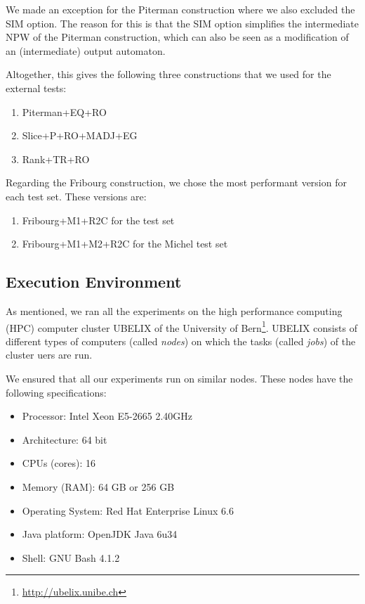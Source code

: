 We made an exception for the Piterman construction where we also excluded the SIM option. The reason for this is that the SIM option simplifies the intermediate NPW of the Piterman construction, which can also be seen as a modification of an (intermediate) output automaton.

Altogether, this gives the following three constructions that we used for the external tests:
\begin{enumerate}
\item Piterman+EQ+RO
\item Slice+P+RO+MADJ+EG
\item Rank+TR+RO
\end{enumerate}

Regarding the Fribourg construction, we chose the most performant version for each test set. These versions are:
\begin{enumerate}
\item Fribourg+M1+R2C for the \goal{} test set
\item Fribourg+M1+M2+R2C for the Michel test set
\end{enumerate}


\subsection{Execution Environment}
\label{4_exec_env}
As mentioned, we ran all the experiments on the high performance computing (HPC) computer cluster UBELIX of the University of Bern\footnote{\url{http://ubelix.unibe.ch}}. UBELIX consists of different types of computers (called \textit{nodes}) on which the tasks (called \textit{jobs}) of the cluster uers are run.

We ensured that all our experiments run on similar nodes. These nodes have the following specifications:
\begin{itemize}
\item Processor: Intel Xeon E5-2665 2.40GHz
\item Architecture: 64 bit
\item CPUs (cores): 16
\item Memory (RAM): 64 GB or 256 GB
\item Operating System: Red Hat Enterprise Linux 6.6
\item Java platform: OpenJDK Java 6u34
\item Shell: GNU Bash 4.1.2
\end{itemize}

